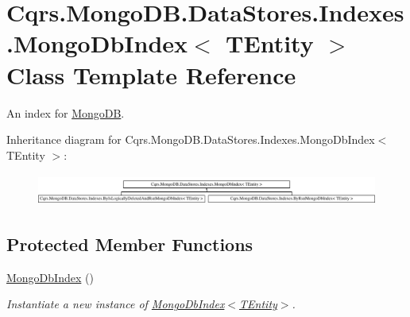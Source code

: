\hypertarget{classCqrs_1_1MongoDB_1_1DataStores_1_1Indexes_1_1MongoDbIndex}{}\section{Cqrs.\+Mongo\+D\+B.\+Data\+Stores.\+Indexes.\+Mongo\+Db\+Index$<$ T\+Entity $>$ Class Template Reference}
\label{classCqrs_1_1MongoDB_1_1DataStores_1_1Indexes_1_1MongoDbIndex}


An index for \hyperlink{namespaceCqrs_1_1MongoDB}{Mongo\+DB}.  


Inheritance diagram for Cqrs.\+Mongo\+D\+B.\+Data\+Stores.\+Indexes.\+Mongo\+Db\+Index$<$ T\+Entity $>$\+:\begin{figure}[H]
\begin{center}
\leavevmode
\includegraphics[height=1.052632cm]{classCqrs_1_1MongoDB_1_1DataStores_1_1Indexes_1_1MongoDbIndex}
\end{center}
\end{figure}
\subsection*{Protected Member Functions}
\begin{DoxyCompactItemize}
\item 
\hyperlink{classCqrs_1_1MongoDB_1_1DataStores_1_1Indexes_1_1MongoDbIndex_a61f4b17dd968f92e81562c70ae062a89_a61f4b17dd968f92e81562c70ae062a89}{Mongo\+Db\+Index} ()
\begin{DoxyCompactList}\small\item\em Instantiate a new instance of \hyperlink{classCqrs_1_1MongoDB_1_1DataStores_1_1Indexes_1_1MongoDbIndex_a61f4b17dd968f92e81562c70ae062a89_a61f4b17dd968f92e81562c70ae062a89}{Mongo\+Db\+Index$<$\+T\+Entity$>$}. \end{DoxyCompactList}\end{DoxyCompactItemize}
